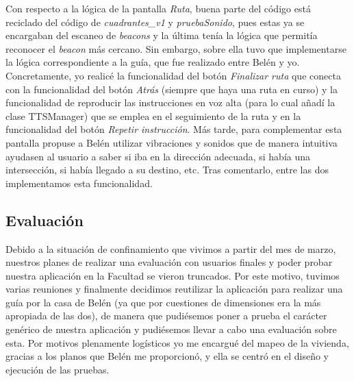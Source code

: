 Con respecto a la lógica de la pantalla \textit{Ruta}, buena parte del código está reciclado del código de \textit{cuadrantes\_v1} y \textit{pruebaSonido}, pues estas ya se encargaban del escaneo de \textit{beacons} y la última tenía la lógica que permitía reconocer el \textit{beacon} más cercano. Sin embargo, sobre ella tuvo que implementarse la lógica correspondiente a la guía, que fue realizado entre Belén y yo. Concretamente, yo realicé la funcionalidad del botón \textit{Finalizar ruta} que conecta con la funcionalidad del botón \textit{Atrás} (siempre que haya una ruta en curso) y la funcionalidad de reproducir las instrucciones en voz alta (para lo cual añadí la clase TTSManager) que se emplea en el seguimiento de la ruta y en la funcionalidad del botón \textit{Repetir instrucción}. Más tarde, para complementar esta pantalla propuse a Belén utilizar vibraciones y sonidos que de manera intuitiva ayudasen al usuario a saber si iba en la dirección adecuada, si había una intersección, si había llegado a su destino, etc. Tras comentarlo, entre las dos implementamos esta funcionalidad.

\subsection{Evaluación}

Debido a la situación de confinamiento que vivimos a partir del mes de marzo, nuestros planes de realizar una evaluación con usuarios finales y poder probar nuestra aplicación en la Facultad se vieron truncados. Por este motivo, tuvimos varias reuniones y finalmente decidimos reutilizar la aplicación para realizar una guía por la casa de Belén (ya que por cuestiones de dimensiones era la más apropiada de las dos), de manera que pudiésemos poner a prueba el carácter genérico de nuestra aplicación y pudiésemos llevar a cabo una evaluación sobre esta. Por motivos plenamente logísticos yo me encargué del mapeo de la vivienda, gracias a los planos que Belén me proporcionó, y ella se centró en el diseño y ejecución de las pruebas. 
